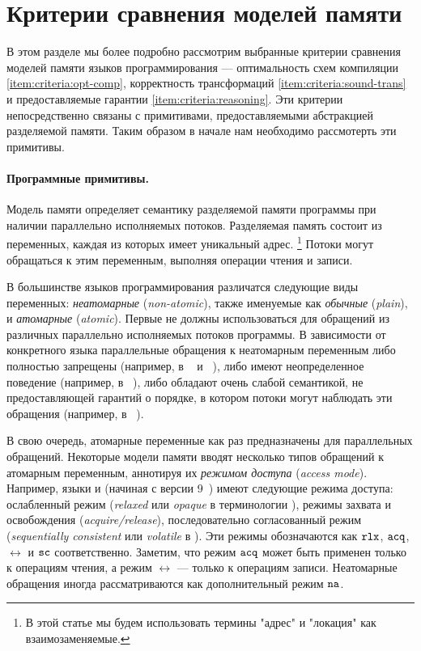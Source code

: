 \section{Критерии сравнения моделей памяти}
\label{sec:background}

В этом разделе мы более подробно рассмотрим 
выбранные критерии сравнения моделей памяти языков программирования ---
 оптимальность схем компиляции \ref{item:criteria:opt-comp},
корректность трансформаций \ref{item:criteria:sound-trans}
и предоставляемые гарантии \ref{item:criteria:reasoning}.
Эти критерии непосредственно связаны с примитивами, 
предоставляемыми абстракцией разделяемой памяти. 
Таким образом в начале нам необходимо рассмотерть эти примитивы. 

\paragraph{Программные примитивы.}
\label{sec:background:primitives}

Модель памяти определяет семантику разделяемой памяти программы
при наличии  параллельно исполняемых потоков. 
Разделяемая память состоит из переменных, 
каждая из которых имеет уникальный адрес.%
\footnote{В этой статье мы будем использовать 
термины "адрес" и "локация" как взаимозаменяемые.}
Потоки могут обращаться к этим переменным, 
выполняя операции чтения и записи. 


В большинстве языков программирования различатся следующие виды переменных:
\emph{неатомарные} (\emph{non-atomic}),
также именуемые как \emph{обычные} (\emph{plain}),
и \emph{атомарные} (\emph{atomic}).
Первые не должны использоваться для  
обращений из различных параллельно исполняемых потоков программы. 
В зависимости от конкретного языка 
параллельные обращения к неатомарным переменным 
либо полностью запрещены 
(например, в  \Haskell~\cite{Marlow-al:Haskell10, Vollmer-al:PPoPP17} и \Rust~\cite{RustBook:19}), 
либо имеют неопределенное поведение (например, в  \CPP~\cite{Boehm-Adve:PLDI08, Batty-al:POPL11}), 
либо обладают очень слабой семантикой,
не предоставляющей гарантий о порядке,
в котором  потоки могут наблюдать эти обращения
(например, в \Java~\cite{Manson-al:POPL05}). 

В свою очередь, атомарные переменные как раз 
предназначены для параллельных обращений. 
Некоторые модели памяти вводят 
несколько типов обращений к атомарным переменным, аннотируя их 
 \emph{режимом доступа} (\emph{access mode}).
Например, языки \CPP и \Java (начиная с версии 9~\cite{Bender-Palsberg:OOPSLA19})
имеют следующие режима доступа: ослабленный режим
(\emph{relaxed} или \emph{opaque} в терминологии \Java),
режимы захвата и освобождения (\emph{acquire/release}), 
последовательно согласованный режим (\emph{sequentially consistent}
или  \emph{volatile} в \Java). 
Эти режимы обозначаются как $\mathtt{rlx}$, ${\mathtt{acq}}$, $\rel$ и ${\mathtt{sc}}$ соответственно.
Заметим, что режим ${\mathtt{acq}}$ может быть применен только к операциям чтения,
а режим $\rel$ --- только к операциям записи.
Неатомарные обращения иногда рассматриваются как дополнительный режим $\mathtt{na}$. 

